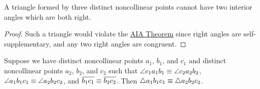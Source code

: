 \begin{cor}\label{cor:a-triangle-has-at-most-one-right-angle}
A triangle formed by three distinct noncollinear points cannot have two interior angles which are both right.
\end{cor}

\begin{proof}
Such a triangle would violate the \hyperref[prop:aia-theorem]{AIA Theorem} since right angles are self-supplementary, and any two right angles are congruent.
\end{proof}

\begin{prop}\label{prop:aas-theorem}
Suppose we have distinct noncollinear points \(a_1\), \(b_1\), and \(c_1\) and distinct noncollinear points \(a_2\), \(b_2\), and \(c_2\) such that \(\angle{c_1a_1b_1} \equiv \angle{c_2a_2b_2}\), \(\angle{a_1b_1c_1} \equiv \angle{a_2b_2c_2}\), and \(\overline{b_1c_1} \equiv \overline{b_2c_2}\).
Then \(\bigtriangleup{a_1b_1c_1} \equiv \bigtriangleup{a_2b_2c_2}\).
\end{prop}

